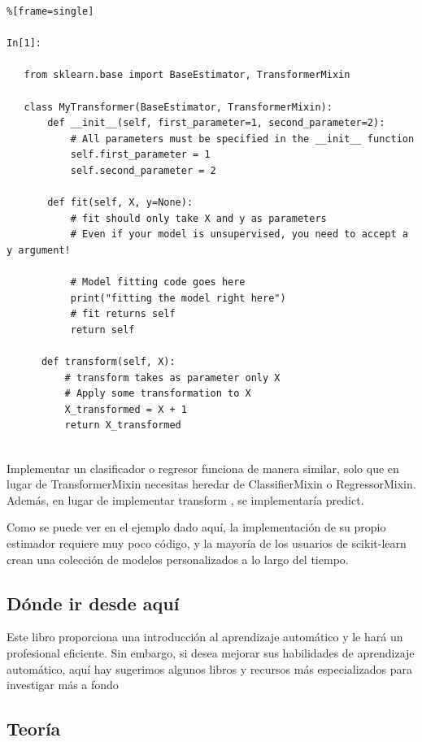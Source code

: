 \begin{lstlisting}%[frame=single]

In[1]:

   from sklearn.base import BaseEstimator, TransformerMixin
   
   class MyTransformer(BaseEstimator, TransformerMixin):
       def __init__(self, first_parameter=1, second_parameter=2):
           # All parameters must be specified in the __init__ function
           self.first_parameter = 1
           self.second_parameter = 2
         
       def fit(self, X, y=None):
           # fit should only take X and y as parameters
           # Even if your model is unsupervised, you need to accept a y argument!
          
           # Model fitting code goes here
           print("fitting the model right here")
           # fit returns self
           return self
          
      def transform(self, X):
          # transform takes as parameter only X
          # Apply some transformation to X
          X_transformed = X + 1
          return X_transformed
         
\end{lstlisting}


Implementar un clasificador o regresor funciona de manera similar, solo que en lugar de 
{\ttfamily TransformerMixin} necesitas heredar de {\ttfamily ClassifierMixin}  o {\ttfamily  RegressorMixin}. Además, en lugar de implementar {\ttfamily transform} , se implementaría { \ttfamily predict}.

 Como se puede ver en el ejemplo dado aquí, la implementación de su propio estimador requiere muy poco código, y la mayoría de los usuarios de  {\ttfamily scikit-learn}  crean una colección de modelos personalizados a lo largo del tiempo.
 
 
 
\subsection{Dónde ir desde aquí}
 
 Este libro proporciona una introducción al aprendizaje automático y le hará un profesional eficiente.
  Sin embargo, si desea mejorar sus habilidades de aprendizaje automático, aquí hay  sugerimos algunos  libros y recursos más especializados para investigar más a fondo


\subsection{Teoría} 

